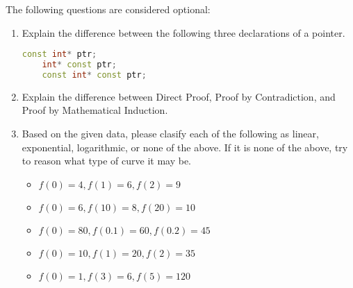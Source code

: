 \documentclass[11pt]{article}
\begin{document}
The following questions are considered optional:

\begin{enumerate}

\item Explain the difference between the following three declarations of a pointer.  
\begin{lstlisting}[language=C++]
    const int* ptr;
    int* const ptr;
    const int* const ptr;
\end{lstlisting}

\item Explain the difference between Direct Proof, Proof by Contradiction, and Proof by Mathematical Induction.

\item Based on the given data, please clasify each of the following as linear, exponential, logarithmic, or none of the above. If it is none of the above, try to reason what type of curve it may be.
\begin{itemize}
    \item $f(0) = 4, f(1) = 6, f(2) = 9$
    \item $f(0) = 6, f(10) = 8, f(20) = 10$
    \item $f(0) = 80, f(0.1) = 60, f(0.2) = 45$
    \item $f(0) = 10, f(1) = 20, f(2) = 35$
    \item $f(0) = 1, f(3) = 6, f(5) = 120$
\end{itemize}

\end{enumerate}

\label{r:lastpage}
\end{document}
